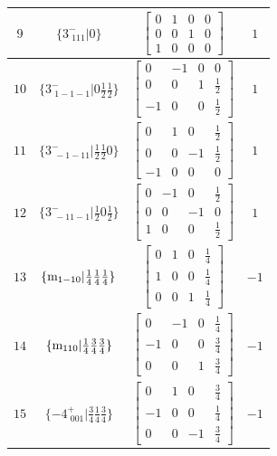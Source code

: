 \documentclass[fleqn,8pt]{jsarticle}
\begin{document}
\begin{longtable}{cccc}
$ 9 $ & $ \{3^{-}_{\,\,111}|0\} $ & $ \begin{bmatrix} 0 & 1 & 0 & 0 \\ 0 & 0 & 1 & 0 \\ 1 & 0 & 0 & 0 \end{bmatrix} $ & $ 1 $ \\ \hline
$ 10 $ & $ \{3^{-}_{\,\,1-1-1}|0 \frac{1}{2} \frac{1}{2}\} $ & $ \begin{bmatrix} 0 & -1 & 0 & 0 \\ 0 & 0 & 1 & \frac{1}{2} \\ -1 & 0 & 0 & \frac{1}{2} \end{bmatrix} $ & $ 1 $ \\ \hline
$ 11 $ & $ \{3^{-}_{\,\,-1-11}|\frac{1}{2} \frac{1}{2} 0\} $ & $ \begin{bmatrix} 0 & 1 & 0 & \frac{1}{2} \\ 0 & 0 & -1 & \frac{1}{2} \\ -1 & 0 & 0 & 0 \end{bmatrix} $ & $ 1 $ \\ \hline
$ 12 $ & $ \{3^{-}_{\,\,-11-1}|\frac{1}{2} 0 \frac{1}{2}\} $ & $ \begin{bmatrix} 0 & -1 & 0 & \frac{1}{2} \\ 0 & 0 & -1 & 0 \\ 1 & 0 & 0 & \frac{1}{2} \end{bmatrix} $ & $ 1 $ \\ \hline
$ 13 $ & $ \{{\rm m}_{1-10}|\frac{1}{4} \frac{1}{4} \frac{1}{4}\} $ & $ \begin{bmatrix} 0 & 1 & 0 & \frac{1}{4} \\ 1 & 0 & 0 & \frac{1}{4} \\ 0 & 0 & 1 & \frac{1}{4} \end{bmatrix} $ & $ -1 $ \\ \hline
$ 14 $ & $ \{{\rm m}_{110}|\frac{1}{4} \frac{3}{4} \frac{3}{4}\} $ & $ \begin{bmatrix} 0 & -1 & 0 & \frac{1}{4} \\ -1 & 0 & 0 & \frac{3}{4} \\ 0 & 0 & 1 & \frac{3}{4} \end{bmatrix} $ & $ -1 $ \\ \hline
$ 15 $ & $ \{-4^{+}_{\,\,001}|\frac{3}{4} \frac{1}{4} \frac{3}{4}\} $ & $ \begin{bmatrix} 0 & 1 & 0 & \frac{3}{4} \\ -1 & 0 & 0 & \frac{1}{4} \\ 0 & 0 & -1 & \frac{3}{4} \end{bmatrix} $ & $ -1 $ \\ \hline

\end{longtable}
\end{document}
